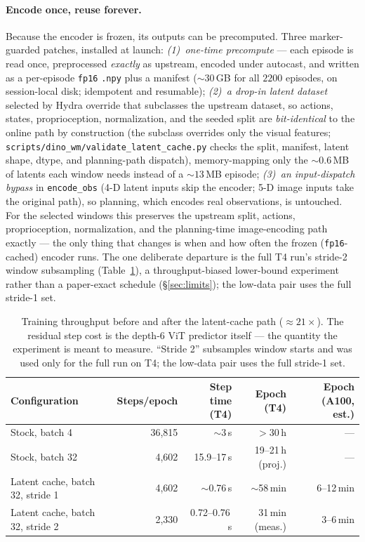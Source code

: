 \documentclass[11pt,a4paper]{article}
\begin{document}
\paragraph{Encode once, reuse forever.} Because the encoder is frozen, its
outputs can be precomputed. Three marker-guarded patches, installed at launch:
\emph{(1)~one-time precompute} --- each episode is read once, preprocessed
\emph{exactly} as upstream, encoded under autocast, and written as a per-episode
\texttt{fp16} \texttt{.npy} plus a manifest (${\sim}30$\,GB for all $2200$
episodes, on session-local disk; idempotent and resumable); \emph{(2)~a drop-in
latent dataset} selected by Hydra override that subclasses the upstream dataset,
so actions, states, proprioception, normalization, and the seeded split are
\emph{bit-identical} to the online path by construction (the subclass overrides
only the visual features; \texttt{scripts/dino\_wm/validate\_latent\_cache.py}
checks the split, manifest, latent shape, dtype, and planning-path dispatch),
memory-mapping only
the ${\sim}0.6$\,MB of latents each window needs instead of a ${\sim}13$\,MB
episode; \emph{(3)~an input-dispatch bypass} in \texttt{encode\_obs} (4-D latent
inputs skip the encoder; 5-D image inputs take the original path), so planning,
which encodes real observations, is untouched. For the selected windows this
preserves the upstream split, actions, proprioception, normalization, and the
planning-time image-encoding path exactly --- the only thing that changes is
when and how often the frozen (\texttt{fp16}-cached) encoder runs. The one
deliberate departure is the full T4 run's stride-2 window subsampling
(Table~\ref{tab:throughput}), a throughput-biased lower-bound experiment rather
than a paper-exact schedule (\S\ref{sec:limits}); the low-data pair uses the full
stride-1 set.

\begin{table}[h]
\centering\small
\begin{tabularx}{\linewidth}{@{}Xrrrr@{}}
\toprule
Configuration & Steps/epoch & Step time (T4) & Epoch (T4) & Epoch (A100, est.) \\
\midrule
Stock, batch 4                   & 36{,}815 & $\sim$3\,s    & $>$30\,h          & --- \\
Stock, batch 32                  & 4{,}602  & 15.9--17\,s   & 19--21\,h (proj.) & --- \\
Latent cache, batch 32, stride 1 & 4{,}602  & $\sim$0.76\,s & $\sim$58\,min     & 6--12\,min \\
Latent cache, batch 32, stride 2 & 2{,}330  & 0.72--0.76\,s & 31\,min (meas.)   & 3--6\,min \\
\bottomrule
\end{tabularx}
\caption{Training throughput before and after the latent-cache path
($\approx\!21\times$). The residual step cost is the depth-6 ViT predictor
itself --- the quantity the experiment is meant to measure. ``Stride 2''
subsamples window starts and was used only for the full run on T4; the low-data
pair uses the full stride-1 set.}
\label{tab:throughput}
\end{table}
\end{document}
